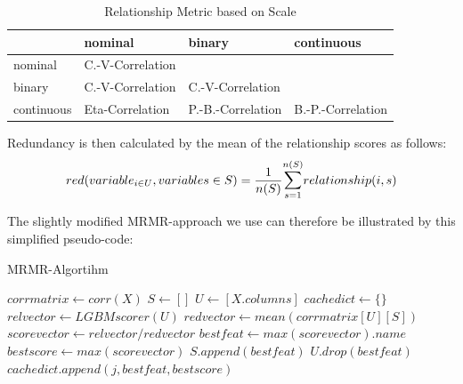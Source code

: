 \documentclass[12pt,titlepage]{article}
\begin{document}
\setlength{\tabcolsep}{10pt} %
\renewcommand{\arraystretch}{1.2}
\begin{center}
\begin{table}[H]
    \begin{tabular}{|l|lll|}
    \hline
     & nominal & binary & continuous      \\
    \hline
    nominal                & C.-V-Correlation &         &                 \\
    binary            & C.-V-Correlation & C.-V-Correlation &                 \\
    continuous             & Eta-Correlation & P.-B.-Correlation & B.-P.-Correlation \\
    \hline
    \end{tabular}
    \caption{Relationship Metric based on Scale}
\label{redtable}
\end{table}
\end{center}
\noindent
Redundancy is then calculated by the mean of the relationship scores as follows:
\vspace{5mm}
\noindent
\begin{equation} \label{redundancy}
    red(variable_{i \in U}, variables \in S) = \frac{1}{n(S)} \mathlarger{\sum}_{s=1}^{n(S)} relationship(i, s)
\end{equation}
\vspace{1mm}

\noindent
The slightly modified MRMR-approach we use can therefore be illustrated by this simplified pseudo-code: \\
\begin{algorithm}[H]
\caption{MRMR-Algortihm}\label{alg:mrmr}
\begin{algorithmic}
    \State $corrmatrix \gets corr(X)$
    \State $S \gets \left[ \right]$
    \State $U \gets \left[X.columns\right]$
    \State $cachedict \gets \{\}$
        \State $relvector \gets LGBMscorer(U)$
        \State $redvector \gets mean(corrmatrix\left[U\right]\left[S\right])$
        \State $scorevector \gets relvector/redvector$
        \State $bestfeat \gets max(scorevector).name$
        \State $bestscore \gets max(scorevector)$
        \State $S.append(bestfeat)$
        \State $U.drop(bestfeat)$
        \State $cachedict.append(j,bestfeat, bestscore)$
    \EndFor
\end{algorithmic}
\end{algorithm}
\vspace{1mm}
\end{document}
